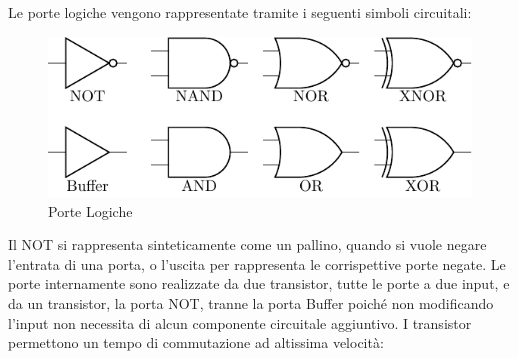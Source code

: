 \documentclass{article}
\numberwithin{equation}{subsection}
\begin{document}
Le porte logiche vengono rappresentate tramite i seguenti simboli circuitali:
\begin{figure}[H]%
    \centering
    \includegraphics{porte-logiche.pdf}%
    \caption{Porte Logiche}%
\end{figure}
Il NOT si rappresenta sinteticamente come un pallino, quando si vuole negare l'entrata di una porta, o l'uscita per rappresenta le corrispettive porte negate. 
Le porte internamente sono realizzate da due transistor, tutte le porte a due input, e da un transistor, la porta NOT, tranne la porta Buffer poiché non modificando l'input non necessita di alcun componente circuitale 
aggiuntivo. I transistor permettono un tempo di commutazione ad altissima velocità:  
\end{document}
